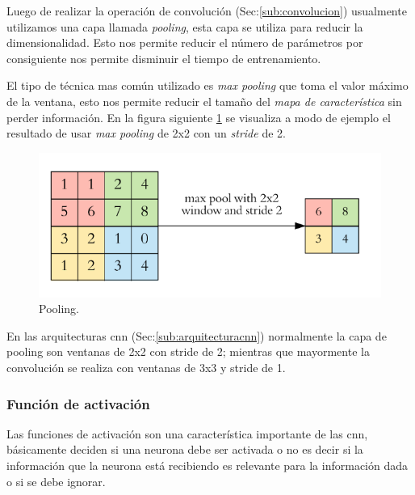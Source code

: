 Luego de realizar la operación de convolución (Sec:\ref{sub:convolucion}) usualmente utilizamos una capa llamada \textit{pooling}, esta capa se utiliza para reducir la dimensionalidad. Esto nos permite reducir el número de parámetros por consiguiente nos permite disminuir el tiempo de entrenamiento.

El tipo de técnica mas común utilizado es \textit{max pooling} que toma el valor máximo de la ventana, esto nos permite reducir el tamaño del \textit{mapa de característica} sin perder información. En la figura siguiente \ref{Fig:Pooling} se visualiza a modo de ejemplo el resultado de usar \textit{max pooling} de 2x2 con un \textit{stride} de 2.

\begin{figure}[H]
 \centering
  \includegraphics[scale=0.4,keepaspectratio=true,clip=true]{imagenes/MarcoTeorico/pooling_1.png}
  \caption{Pooling.} \label{Fig:Pooling}%
\end{figure}

En las arquitecturas \ac{cnn} (Sec:\ref{sub:arquitecturacnn}) normalmente la capa de pooling son ventanas de 2x2 con stride de 2; mientras que mayormente la convolución se realiza con ventanas de 3x3 y stride de 1. 

\subsubsection{Función de activación}\label{sub:relu}
Las funciones de activación son una característica  importante de las \ac{cnn}, básicamente deciden si una neurona debe ser activada o no es decir si la información que la neurona está recibiendo es relevante para la información dada o si se debe ignorar.

